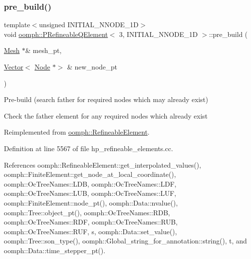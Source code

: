 \mbox{\label{classoomph_1_1PRefineableQElement_3_013_00_01INITIAL__NNODE__1D_01_4_a774abc8e5c6c63abb2c702098d93002d}} 
\subsubsection{\texorpdfstring{pre\+\_\+build()}{pre\_build()}}
{\footnotesize\ttfamily template$<$unsigned I\+N\+I\+T\+I\+A\+L\+\_\+\+N\+N\+O\+D\+E\+\_\+1D$>$ \\
void \hyperlink{classoomph_1_1PRefineableQElement}{oomph\+::\+P\+Refineable\+Q\+Element}$<$ 3, I\+N\+I\+T\+I\+A\+L\+\_\+\+N\+N\+O\+D\+E\+\_\+1D $>$\+::pre\+\_\+build (\begin{DoxyParamCaption}\item[{\hyperlink{classoomph_1_1Mesh}{Mesh} $\ast$\&}]{mesh\+\_\+pt,  }\item[{\hyperlink{classoomph_1_1Vector}{Vector}$<$ \hyperlink{classoomph_1_1Node}{Node} $\ast$$>$ \&}]{new\+\_\+node\+\_\+pt }\end{DoxyParamCaption})\hspace{0.3cm}{\ttfamily [virtual]}}



Pre-\/build (search father for required nodes which may already exist) 

Check the father element for any required nodes which already exist 

Reimplemented from \hyperlink{classoomph_1_1RefineableElement_ab30d66018b994b03731e2942f6a15f36}{oomph\+::\+Refineable\+Element}.



Definition at line 5567 of file hp\+\_\+refineable\+\_\+elements.\+cc.



References oomph\+::\+Refineable\+Element\+::get\+\_\+interpolated\+\_\+values(), oomph\+::\+Finite\+Element\+::get\+\_\+node\+\_\+at\+\_\+local\+\_\+coordinate(), oomph\+::\+Oc\+Tree\+Names\+::\+L\+DB, oomph\+::\+Oc\+Tree\+Names\+::\+L\+DF, oomph\+::\+Oc\+Tree\+Names\+::\+L\+UB, oomph\+::\+Oc\+Tree\+Names\+::\+L\+UF, oomph\+::\+Finite\+Element\+::node\+\_\+pt(), oomph\+::\+Data\+::nvalue(), oomph\+::\+Tree\+::object\+\_\+pt(), oomph\+::\+Oc\+Tree\+Names\+::\+R\+DB, oomph\+::\+Oc\+Tree\+Names\+::\+R\+DF, oomph\+::\+Oc\+Tree\+Names\+::\+R\+UB, oomph\+::\+Oc\+Tree\+Names\+::\+R\+UF, s, oomph\+::\+Data\+::set\+\_\+value(), oomph\+::\+Tree\+::son\+\_\+type(), oomph\+::\+Global\+\_\+string\+\_\+for\+\_\+annotation\+::string(), t, and oomph\+::\+Data\+::time\+\_\+stepper\+\_\+pt().

